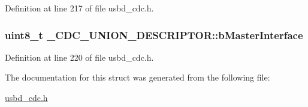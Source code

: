 Definition at line 217 of file usbd\+\_\+cdc.\+h.

\subsubsection[{\texorpdfstring{b\+Master\+Interface}{bMasterInterface}}]{\setlength{\rightskip}{0pt plus 5cm}uint8\+\_\+t \+\_\+\+C\+D\+C\+\_\+\+U\+N\+I\+O\+N\+\_\+\+D\+E\+S\+C\+R\+I\+P\+T\+O\+R\+::b\+Master\+Interface}\hypertarget{struct__CDC__UNION__DESCRIPTOR_aaa7e80367c520e1fc09a73f336df048e}{}\label{struct__CDC__UNION__DESCRIPTOR_aaa7e80367c520e1fc09a73f336df048e}


Definition at line 220 of file usbd\+\_\+cdc.\+h.



The documentation for this struct was generated from the following file\+:\begin{DoxyCompactItemize}
\item 
\hyperlink{usbd__cdc_8h}{usbd\+\_\+cdc.\+h}\end{DoxyCompactItemize}
